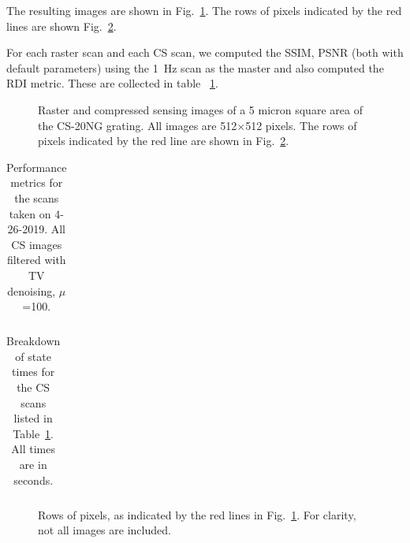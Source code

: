 \documentclass[twocolumn,oneside]{IEEEtran/IEEEtran}
\begin{document}
The resulting images are shown in Fig.~\ref{fig:resultsF1_images}. The rows of
pixels indicated by the red lines are shown Fig.~\ref{fig:pixel_rows}.


For each raster scan and each CS scan, we computed the SSIM, PSNR (both with
default parameters) using the 1~Hz scan as the master and also computed the RDI
metric. These are collected in table ~\ref{tab:rast_vs_cs_v1}.

\begin{figure}
  
  \caption{Raster and compressed sensing images of a 5 micron square area of the
    CS-20NG grating. All images are 512$\times$512 pixels. The rows of pixels
    indicated by the red line are shown in Fig.~\ref{fig:pixel_rows}.}
  \label{fig:resultsF1_images}
\end{figure}



\begin{table}[t!]
  \centering
  \caption{Performance metrics for the scans taken on 4-26-2019. All CS images
    filtered with TV denoising, $\mu$=100.}
  \begin{tabular}{cccccc}
    
  \end{tabular}
  \label{tab:rast_vs_cs_v1}
\end{table}

\begin{table}[t!]
  \centering
  \caption{Breakdown of state times for the CS scans listed in
    Table~\ref{tab:rast_vs_cs_v1}. All times are in seconds.}
  \label{tab:final_state_times}
  \begin{tabular}{ccccccc}
    
  \end{tabular}
\end{table}

\begin{figure}[t!]
  
  \caption{Rows of pixels, as indicated by the red lines in
    Fig.~\ref{fig:resultsF1_images}. For clarity, not all images are included.}
  \label{fig:pixel_rows}
\end{figure}
\end{document}
